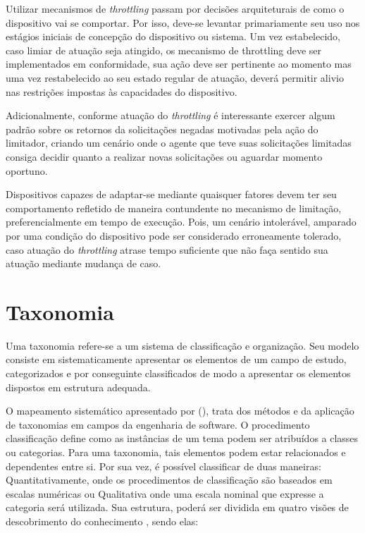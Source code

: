 Utilizar mecanismos de \textit{throttling} passam por decisões arquiteturais de como o dispositivo vai se comportar. Por isso, deve-se levantar primariamente seu uso nos estágios iniciais de concepção do dispositivo ou sistema. Um vez estabelecido, caso limiar de atuação seja atingido, os mecanismo de throttling deve ser implementados em conformidade, sua ação deve ser pertinente ao momento mas uma vez restabelecido ao seu estado regular de atuação, deverá permitir alivio nas restrições impostas às capacidades do dispositivo.

Adicionalmente, conforme atuação do \textit{throttling} é interessante exercer algum padrão sobre os retornos da solicitações negadas motivadas pela ação do limitador, criando um cenário onde o agente que teve suas solicitações limitadas consiga decidir quanto a realizar novas solicitações ou aguardar momento oportuno.

Dispositivos capazes de adaptar-se mediante quaisquer fatores devem ter seu comportamento refletido de maneira contundente no mecanismo de limitação, preferencialmente em tempo de execução. Pois, um cenário intolerável, amparado por uma condição do dispositivo pode ser considerado erroneamente tolerado, caso atuação do \textit{throttling} atrase tempo suficiente que não faça sentido sua atuação mediante mudança de caso.

\section{Taxonomia}
\label{cap2:taxonomia}

Uma taxonomia refere-se a um sistema de classificação e organização. Seu modelo consiste em sistematicamente apresentar os elementos de um campo de estudo, categorizados e por conseguinte classificados de modo a apresentar os elementos dispostos em estrutura adequada.

O mapeamento sistemático apresentado por \citeauthor{usman_taxonomies_2017} (\citeyear{usman_taxonomies_2017}), trata dos métodos e da aplicação de taxonomias em campos da engenharia de software. O procedimento classificação define como as instâncias de um tema podem ser atribuídos a classes ou categorias. Para uma taxonomia, tais elementos podem estar relacionados e dependentes entre si. Por sua vez, é possível classificar de duas maneiras: Quantitativamente, onde os procedimentos de classificação são baseados em escalas numéricas ou Qualitativa onde uma escala nominal que expresse a categoria será utilizada. Sua estrutura, poderá ser dividida em quatro visões de descobrimento do conhecimento \cite{kwasnik_role_nodate}, sendo elas:

